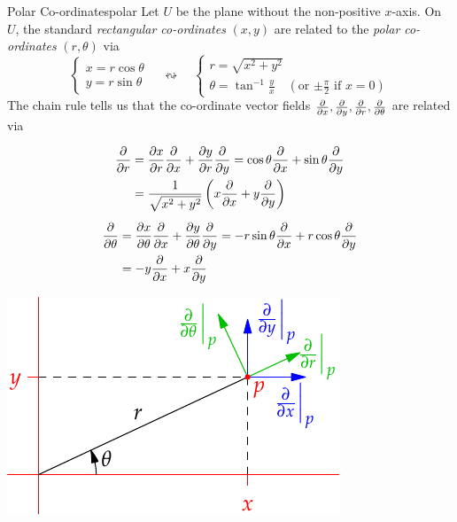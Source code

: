 \begin{example}{Polar Co-ordinates}{polar}
	Let $U$ be the plane without the non-positive $x$-axis. On $U$, the standard \emph{rectangular co-ordinates} $(x,y)$ are related to the \emph{polar co-ordinates} $(r,\theta)$ via
	\[
		\begin{cases}
			x=r\cos\theta\\
			y=r\sin\theta
		\end{cases}
		\quad\leftrightsquigarrow\quad
		\begin{cases}
			r=\sqrt{x^2+y^2}\\
			\theta=\tan^{-1}\frac yx\quad (\text{or $\pm\frac\pi 2$ if $x=0$})
		\end{cases}
	\]
	The chain rule tells us that the co-ordinate vector fields $\partials x,\partials y,\partials r,\partials\theta$ are related via\par
	\begin{minipage}[t]{0.6\linewidth}\vspace{-10pt}
		\begin{gather*}
			\begin{aligned}
				\partials r&=\partials[x]{r}\partials x+\partials[y]{r}\partials{y} =\cos\theta\partials x+\sin\theta\partials y\\
				&=\frac 1{\sqrt{x^2+y^2}}\left(x\partials x+y\partials y\right)
			\end{aligned}
			\\[5pt]
			\begin{aligned}
				\partials\theta&=\partials[x]{\theta}\partials x+\partials[y]{\theta}\partials{y} =-r\sin\theta\partials x+r\cos\theta\partials y\\
				&=-y\partials x+x\partials y
			\end{aligned}
		\end{gather*}
	\end{minipage}
	\hfill
	\begin{minipage}[t]{0.39\linewidth}\vspace{0pt}
		\flushright\includegraphics{forms-polar}

\end{minipage}
\end{example}

